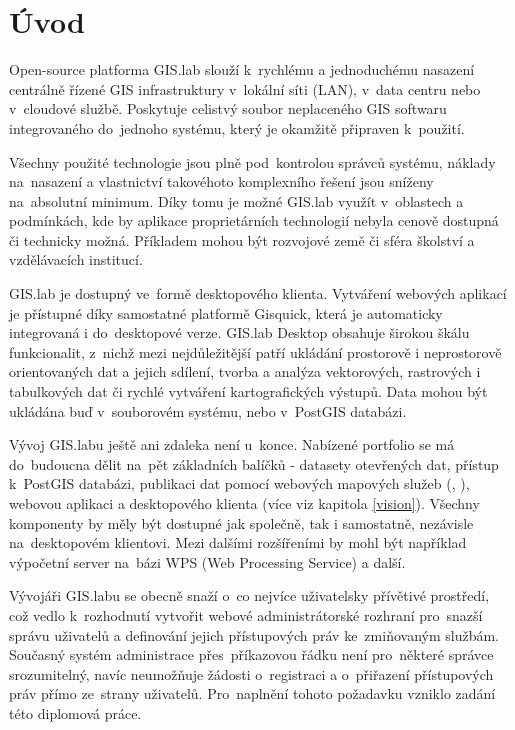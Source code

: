 \chapter*{Úvod}
\label{1-uvod}

Open-source platforma GIS.lab slouží k~rychlému a jednoduchému
nasazení centrálně řízené GIS infrastruktury v~lokální síti (LAN),
v~data centru nebo v~cloudové službě. Poskytuje celistvý soubor
neplaceného GIS softwaru integrovaného do~jednoho systému, který je
okamžitě připraven k~použití.

Všechny použité technologie jsou plně pod~kontrolou správců systému, náklady
na~nasazení a vlastnictví takovéhoto komplexního řešení jsou sníženy
na~absolutní minimum. Díky tomu je možné GIS.lab využít v~oblastech a
podmínkách, kde by aplikace proprietárních technologií nebyla cenově dostupná či
technicky možná. Příkladem mohou být rozvojové země či sféra školství a vzdělávacích institucí.

GIS.lab je dostupný ve~formě desktopového klienta. Vytváření webových aplikací je přístupné díky samostatné platformě Gisquick, která je automaticky integrovaná i do~desktopové verze. GIS.lab
Desktop obsahuje širokou škálu funkcionalit, z~nichž mezi nejdůležitější
patří ukládání prostorově i neprostorově orientovaných dat a jejich
sdílení, tvorba a analýza vektorových, rastrových i tabulkových dat
či rychlé vytváření kartografických výstupů. Data mohou být ukládána buď v~souborovém systému, nebo v~PostGIS databázi.

Vývoj GIS.labu ještě ani zdaleka není u~konce. Nabízené portfolio se
má do~budoucna dělit na~pět základních balíčků - datasety otevřených dat, přístup k~PostGIS
databázi, publikaci dat pomocí webových mapových služeb (,
), webovou aplikaci a desktopového klienta (více viz kapitola
\ref{vision}). Všechny komponenty by měly být dostupné jak společně, tak i samostatně, nezávisle na~desktopovém klientovi. Mezi dalšími rozšířeními by mohl být například výpočetní server na~bázi WPS (Web Processing Service) a další.

Vývojáři GIS.labu se obecně snaží o~co nejvíce uživatelsky přívětivé
prostředí, což vedlo k~rozhodnutí vytvořit webové
administrátorské rozhraní pro~snazší správu uživatelů a definování
jejich přístupových práv ke~zmiňovaným službám. Současný systém
administrace přes~příkazovou řádku není pro~některé správce
srozumitelný, navíc neumožňuje žádosti o~registraci a o~přiřazení
přístupových práv přímo ze~strany uživatelů. Pro~naplnění tohoto
požadavku vzniklo zadání této diplomová práce.

